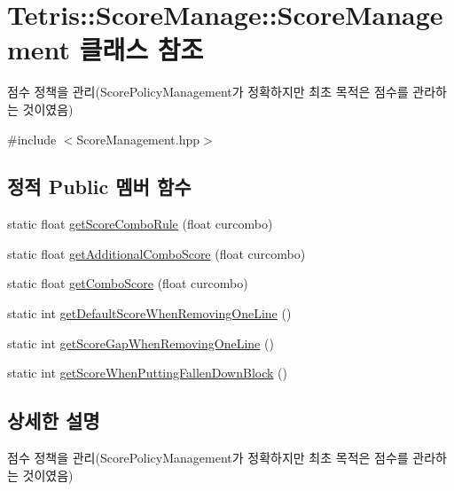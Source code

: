 \hypertarget{class_tetris_1_1_score_manage_1_1_score_management}{}\section{Tetris\+:\+:Score\+Manage\+:\+:Score\+Management 클래스 참조}
\label{class_tetris_1_1_score_manage_1_1_score_management}


점수 정책을 관리(Score\+Policy\+Management가 정확하지만 최초 목적은 점수를 관라하는 것이였음)  




{\ttfamily \#include $<$Score\+Management.\+hpp$>$}

\subsection*{정적 Public 멤버 함수}
\begin{DoxyCompactItemize}
\item 
static float \hyperlink{class_tetris_1_1_score_manage_1_1_score_management_a41c245dcf773c6c677c2e31f6ac17944}{get\+Score\+Combo\+Rule} (float curcombo)
\item 
static float \hyperlink{class_tetris_1_1_score_manage_1_1_score_management_a66b6a1d3fdc8fb9f91f1d7bfc7854579}{get\+Additional\+Combo\+Score} (float curcombo)
\item 
static float \hyperlink{class_tetris_1_1_score_manage_1_1_score_management_a89203c0689645e7e4ad75d8fd634aa11}{get\+Combo\+Score} (float curcombo)
\item 
static int \hyperlink{class_tetris_1_1_score_manage_1_1_score_management_a1bedf7a989466ad1b6b8b2259eb2eff7}{get\+Default\+Score\+When\+Removing\+One\+Line} ()
\item 
static int \hyperlink{class_tetris_1_1_score_manage_1_1_score_management_a2991c1eb0595da71788aba706e0b27b7}{get\+Score\+Gap\+When\+Removing\+One\+Line} ()
\item 
static int \hyperlink{class_tetris_1_1_score_manage_1_1_score_management_a275253fb7c1bb1820ddba3b666b9db09}{get\+Score\+When\+Putting\+Fallen\+Down\+Block} ()
\end{DoxyCompactItemize}


\subsection{상세한 설명}
점수 정책을 관리(Score\+Policy\+Management가 정확하지만 최초 목적은 점수를 관라하는 것이였음) 

